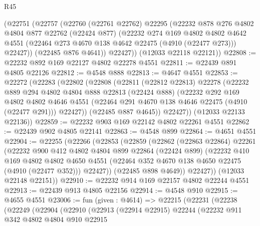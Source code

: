 \begin{lexlean}{R45}
\begin{coremodule}
      (@22751
        (@22757
          (@22760
            (@22761 @22762)
            @22295
            (@22232
              @878
              @276
              @4802
              @4804
              @877
              @22762
              (@22424 @877)
              (@22232
                @274
                @169
                @4802
                @4802
                @4642
                @4551
                (@22464 @273 @4670 @138 @4642 @22475 (@4910 (@22477 @273)))
                @22427))
            (@22485 @876 @4641))
          @22427))
      (@12033 @22118 @22121))
@22808 := @22232 @892 @169 @22127 @4802 @22278 @4551
@22811 := @22439 @891 @4805 @22126
@22812 := @4548 @888
@22813 := @4647 @4551
@22853 := @22272
    (@22283
      (@22802
        (@22808
          (@22811
            (@22812 @22813)
            @22278
            (@22232
              @889
              @294
              @4802
              @4804
              @888
              @22813
              (@22424 @888)
              (@22232
                @292
                @169
                @4802
                @4802
                @4646
                @4551
                (@22464 @291 @4670 @138 @4646 @22475 (@4910 (@22477 @291)))
                @22427))
            (@22485 @887 @4645))
          @22427))
      (@12033 @22133 @22136))
@22859 := @22232 @903 @169 @22142 @4802 @22261 @4551
@22862 := @22439 @902 @4805 @22141
@22863 := @4548 @899
@22864 := @4651 @4551
@22904 := @22255
    (@22266
      (@22853
        (@22859
          (@22862
            (@22863 @22864)
            @22261
            (@22232
              @900
              @412
              @4802
              @4804
              @899
              @22864
              (@22424 @899)
              (@22232
                @410
                @169
                @4802
                @4802
                @4650
                @4551
                (@22464 @352 @4670 @138 @4650 @22475 (@4910 (@22477 @352)))
                @22427))
            (@22485 @898 @4649))
          @22427))
      (@12033 @22148 @22151))
@22910 := @22232 @914 @169 @22157 @4802 @22244 @4551
@22913 := @22439 @913 @4805 @22156
@22914 := @4548 @910
@22915 := @4655 @4551
@23006 := fun (given : @4614) =>
  @22215
    (@22231
      (@22238
        (@22249
          (@22904
            (@22910
              (@22913
                (@22914 @22915)
                @22244
                (@22232
                  @911
                  @342
                  @4802
                  @4804
                  @910
                  @22915

\end{coremodule}
\end{lexlean}
